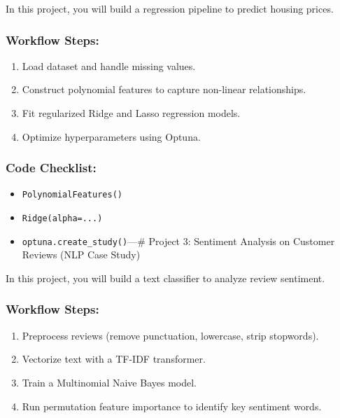 In this project, you will build a regression pipeline to predict housing
prices.

\subsubsection{Workflow Steps:}\label{workflow-steps-1}

\begin{enumerate}
\def\labelenumi{\arabic{enumi}.}
\tightlist
\item
  Load dataset and handle missing values.
\item
  Construct polynomial features to capture non-linear relationships.
\item
  Fit regularized Ridge and Lasso regression models.
\item
  Optimize hyperparameters using Optuna.
\end{enumerate}

\subsubsection{Code Checklist:}\label{code-checklist-1}

\begin{itemize}
\tightlist
\item
  \texttt{PolynomialFeatures()}
\item
  \texttt{Ridge(alpha=...)}
\item
  \texttt{optuna.create\_study()}\n\n---\n\n\# Project 3: Sentiment
  Analysis on Customer Reviews (NLP Case Study)
\end{itemize}

In this project, you will build a text classifier to analyze review
sentiment.

\subsubsection{Workflow Steps:}\label{workflow-steps-2}

\begin{enumerate}
\def\labelenumi{\arabic{enumi}.}
\tightlist
\item
  Preprocess reviews (remove punctuation, lowercase, strip stopwords).
\item
  Vectorize text with a TF-IDF transformer.
\item
  Train a Multinomial Naive Bayes model.
\item
  Run permutation feature importance to identify key sentiment words.
\end{enumerate}

